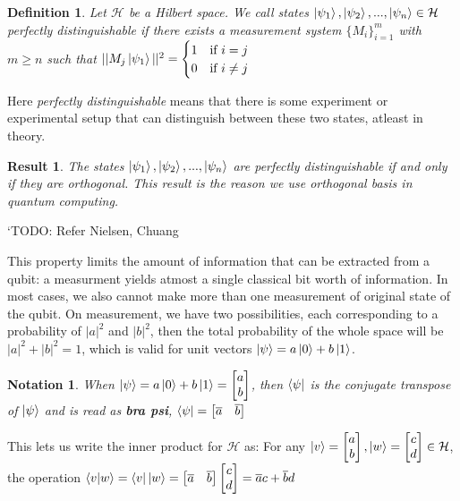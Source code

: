 \documentclass[12pt,twoside]{report}
\newtheorem{defn}[subsection]{Definition}
\newtheorem{notation}[subsection]{Notation}
\newtheorem{result}[subsection]{Result}
\begin{document}
\begin{defn}
    Let $\mathcal{H}$ be a Hilbert space. We call states $\ket{\psi_1}, \ket{\psi_2}, ..., \ket{\psi_n} \in \mathcal{H}$ perfectly distinguishable if there exists a measurement system $\{ M_i \}_{i=1}^m$ with $m \geq n$ such that $|| M_j \ket{\psi_1} ||^2 = \begin{cases} 1 & \text{if } i = j \\ 0 & \text{if } i \neq j \end{cases}$ 
\end{defn}
Here \textit{perfectly distinguishable} means that there is some experiment or experimental setup that can distinguish between these two states, atleast in theory.
\begin{result}
    The states $\ket{\psi_1}, \ket{\psi_2}, ..., \ket{\psi_n}$ are perfectly distinguishable if and only if they are orthogonal. This result is the reason we use orthogonal basis in quantum computing.
\end{result}
`TODO: Refer Nielsen, Chuang


This property limits the amount of information that can be extracted from a qubit: a measurment yields atmost a single classical bit worth of information. In most cases, we also cannot make more than one measurement of original state of the qubit. On measurement, we have two possibilities, each corresponding to a probability of $|a|^2$ and $|b|^2$, then the total probability of the whole space will be $|a|^2 + |b|^2 = 1$, which is valid for unit vectors $\ket{\psi} = a \ket{0} + b \ket{1}$.

\begin{notation}
    When $\ket{\psi} = a \ket{0} + b \ket{1} = \begin{bmatrix} a \\ b \end{bmatrix}$, then $\bra{\psi}$ is the conjugate transpose of $\ket{\psi}$ and is read as \textbf{bra psi}, $\bra{\psi} = \begin{bmatrix} \overline{a} & \overline{b}\end{bmatrix}$
\end{notation}

This lets us write the inner product for $\mathcal{H}$ as:
For any $\ket{v} = \begin{bmatrix} a \\ b \end{bmatrix}, \ket{w} = \begin{bmatrix} c \\ d \end{bmatrix} \in \mathcal{H}$, the operation $\braket{v|w} = \bra{v}\ket{w} = \begin{bmatrix} \overline{a} & \overline{b} \end{bmatrix} \begin{bmatrix} c \\ d \end{bmatrix} = \overline{a} c + \overline{b} d $
\end{document}

